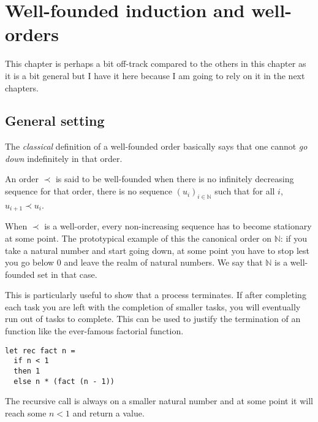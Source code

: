 \chapter{Well-founded induction and well-orders}

This chapter is perhaps a bit off-track compared to the others in this chapter
as it is a bit general but I have it here because I am going to rely on it in
the next chapters.

\section{General setting}

The \emph{classical} definition of a well-founded order basically says that one
cannot \emph{go down} indefinitely in that order.

\begin{definition}
  An order \(\prec\) is said to be well-founded when there is no infinitely
  decreasing sequence for that order, \ie there is no sequence
  \((u_i)_{i \in \mathbb{N}}\) such that for all \(i\), \(u_{i+1} \prec u_i\).
\end{definition}

When \(\prec\) is a well-order, every non-increasing sequence has to become
stationary at some point.
The prototypical example of this the canonical order on \(\mathbb{N}\): if you
take a natural number and start going down, at some point you have to stop lest
you go below \(0\) and leave the realm of natural numbers.
We say that \(\mathbb{N}\) is a well-founded set in that case.

This is particularly useful to show that a process terminates. If after
completing each task you are left with the completion of smaller tasks,
you will eventually run out of tasks to complete.
This can be used to justify the termination of an \ocaml function like the
ever-famous factorial function.
\begin{verbatim}
let rec fact n =
  if n < 1
  then 1
  else n * (fact (n - 1))
\end{verbatim}
The recursive call is always on a smaller natural number and at some point it
will reach some \(n < 1\) and return a value.

